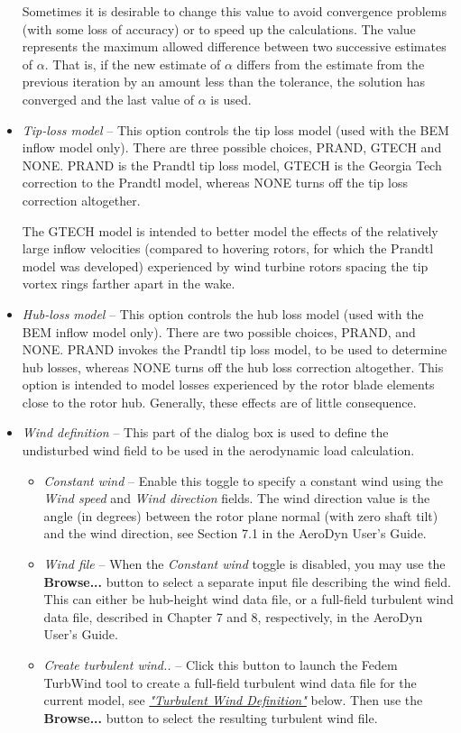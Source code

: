 \begin{itemize}
  Sometimes it is desirable to change this value to avoid convergence problems
  (with some loss of accuracy) or to speed up the calculations.
  The value represents the maximum allowed difference between two successive
  estimates of $\alpha$. That is, if the new estimate of $\alpha$ differs from
  the estimate from the previous iteration by an amount less than the tolerance,
  the solution has converged and the last value of $\alpha$ is used.

\item{\sl Tip-loss model} --
  This option controls the tip loss model (used with the BEM inflow model only).
  There are three possible choices, PRAND, GTECH and NONE.
  PRAND is the Prandtl tip loss model, GTECH is the Georgia Tech correction to
  the Prandtl model, whereas NONE turns off the tip loss correction altogether.

  The GTECH model is intended to better model the effects of the relatively
  large inflow velocities (compared to hovering rotors, for which the Prandtl
  model was developed) experienced by wind turbine rotors spacing the tip vortex
  rings farther apart in the wake.

\item{\sl Hub-loss model} --
  This option controls the hub loss model (used with the BEM inflow model only).
  There are two possible choices, PRAND, and NONE.
  PRAND invokes the Prandtl tip loss model, to be used to determine hub losses,
  whereas NONE turns off the hub loss correction altogether.
  This option is intended to model losses experienced by the rotor blade
  elements close to the rotor hub.
  Generally, these effects are of little consequence.

\item{\sl Wind definition} --
  This part of the dialog box is used to define the undisturbed wind field
  to be used in the aerodynamic load calculation.

  \begin{itemize}
  \item{\sl Constant wind} --
    Enable this toggle to specify a constant wind using the {\sl Wind speed}
    and {\sl Wind direction} fields.
    The wind direction value is the angle (in degrees) between the rotor plane
    normal (with zero shaft tilt) and the wind direction,
    see Section 7.1 in the AeroDyn User's Guide.
  \item{\sl Wind file} --
    When the {\sl Constant wind} toggle is disabled,
    you may use the \textbf{Browse...} button to select a separate input file
    describing the wind field.
    This can either be hub-height wind data file,
    or a full-field turbulent wind data file, described in Chapter 7 and 8,
    respectively, in the AeroDyn User's Guide.
  \item{\sl Create turbulent wind..} --
    Click this button to launch the Fedem TurbWind tool to create a full-field
    turbulent wind data file for the current model, see
    \protect\hyperlink{turbulent-wind-definition}
                      {\sl"Turbulent Wind Definition"} below.
    Then use the \textbf{Browse...} button to select the resulting
    turbulent wind file.
  \end{itemize}


\end{itemize}
